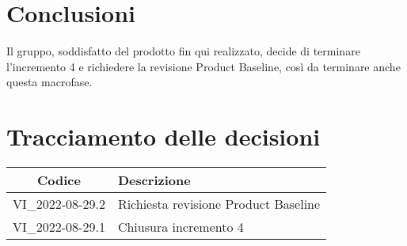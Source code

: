 \section{Conclusioni}
Il gruppo, soddisfatto del prodotto fin qui realizzato, decide di terminare l'incremento 4 e richiedere la revisione Product Baseline, così da terminare anche questa macrofase.
\newpage

\section*{Tracciamento delle decisioni}
	\renewcommand{\arraystretch}{1.8} %
	\begin{tabular}{ |c|l| }
		\hline
		\textbf{Codice} & \textbf{Descrizione} \\
		\hline
		VI\_2022-08-29.2 & Richiesta revisione Product Baseline\\ %
		\hline
		VI\_2022-08-29.1 & Chiusura incremento 4\\ %
		\hline
	\end{tabular}